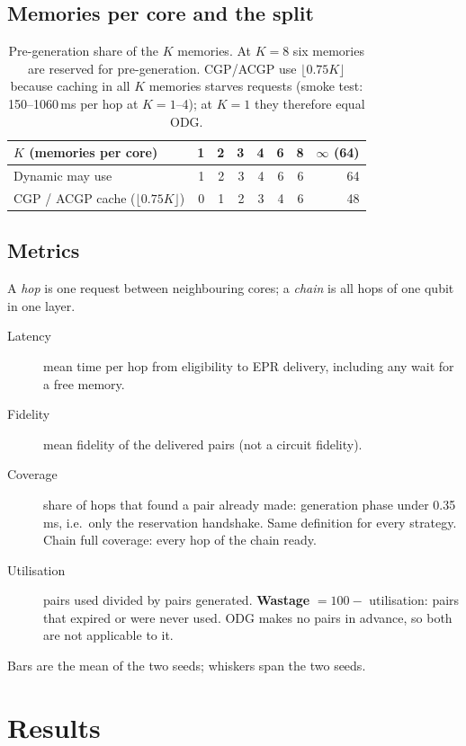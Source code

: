 \documentclass[11pt,a4paper]{report}
\begin{document}
\section{Memories per core and the split}
\begin{table}[H]\centering\small
\begin{tabular}{lrrrrrrr}\toprule
$K$ (memories per core) & 1 & 2 & 3 & 4 & 6 & 8 & $\infty$ (64)\\\midrule
Dynamic may use & 1 & 2 & 3 & 4 & 6 & 6 & 64\\
CGP / ACGP cache ($\lfloor0.75K\rfloor$) & 0 & 1 & 2 & 3 & 4 & 6 & 48\\\bottomrule
\end{tabular}
\caption{Pre-generation share of the $K$ memories. At $K=8$ six memories are reserved for pre-generation. CGP/ACGP use
$\lfloor0.75K\rfloor$ because caching in all $K$ memories starves requests (smoke test: 150--1060\,ms per hop at
$K=1$--4); at $K=1$ they therefore equal ODG.}\end{table}

\section{Metrics}
A \emph{hop} is one request between neighbouring cores; a \emph{chain} is all hops of one qubit in one layer.
\begin{description}
\item[Latency] mean time per hop from eligibility to EPR delivery, including any wait for a free memory.
\item[Fidelity] mean fidelity of the delivered pairs (not a circuit fidelity).
\item[Coverage] share of hops that found a pair already made: generation phase under 0.35\,ms, i.e.\ only the
      reservation handshake. Same definition for every strategy. Chain full coverage: every hop of the chain ready.
\item[Utilisation] pairs used divided by pairs generated. \textbf{Wastage} $=100-$ utilisation: pairs that expired or
      were never used. ODG makes no pairs in advance, so both are not applicable to it.
\end{description}
Bars are the mean of the two seeds; whiskers span the two seeds.

\chapter{Results}

\end{document}
